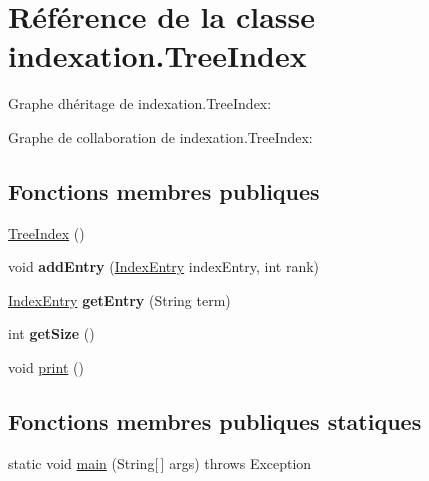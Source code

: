 \hypertarget{classindexation_1_1TreeIndex}{}\section{Référence de la classe indexation.\+Tree\+Index}
\label{classindexation_1_1TreeIndex}


Graphe d\textquotesingle{}héritage de indexation.\+Tree\+Index\+:


Graphe de collaboration de indexation.\+Tree\+Index\+:
\subsection*{Fonctions membres publiques}
\begin{DoxyCompactItemize}
\item 
\hyperlink{classindexation_1_1TreeIndex_af205f794f0b231d2709fda820e6108d5}{Tree\+Index} ()
\item 
\mbox{\label{classindexation_1_1TreeIndex_aa54b979220826d20c303bd1699b68c49}} 
void {\bfseries add\+Entry} (\hyperlink{classindexation_1_1content_1_1IndexEntry}{Index\+Entry} index\+Entry, int rank)
\item 
\mbox{\label{classindexation_1_1TreeIndex_a2850a60a6acba8ed5eed50bd79c9eddd}} 
\hyperlink{classindexation_1_1content_1_1IndexEntry}{Index\+Entry} {\bfseries get\+Entry} (String term)
\item 
\mbox{\label{classindexation_1_1TreeIndex_ad3bea2ab6c3ffe4fe4918f1f64ab9a64}} 
int {\bfseries get\+Size} ()
\item 
void \hyperlink{classindexation_1_1TreeIndex_a41a0e0e561611ded850490635451b6a3}{print} ()
\end{DoxyCompactItemize}
\subsection*{Fonctions membres publiques statiques}
\begin{DoxyCompactItemize}
\item 
static void \hyperlink{classindexation_1_1TreeIndex_a4f55b3dbea75a32916f507012e3f2b29}{main} (String\mbox{[}$\,$\mbox{]} args)  throws Exception  	
\end{DoxyCompactItemize}


